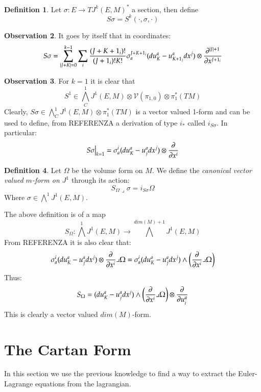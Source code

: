 \documentclass[12pt,a4paper]{report}
\theoremstyle{definition}
\newtheorem{Def}{Definition}[chapter]
\theoremstyle{Theorem}
\theoremstyle{break}
\theoremstyle{definition}
\newtheorem{Obs}[Def]{Observation}
\begin{document}
		\begin{Def}
			Let $\sigma:E\rightarrow TJ^k(E,M)^*$ a section, then define 
			$$S\sigma=S^k(\cdot,\sigma,\cdot)$$
		\end{Def}
		\begin{Obs}
			It goes by itself that in coordinates:
			$$S\sigma=\sum_{|J+K|=0}^{k-1}\sum_i{(J+K+1_i)!\over (J+1_i)!K!}\sigma^{J+K+1_i}_a(du^a_K-u^a_{K+1_j}dx^j)\otimes{\partial^{|J|+1} \over \partial x^{J+1_i}}$$
		\end{Obs}
		\begin{Obs}
			For $k=1$ it is clear that 
			$$S^1\in \bigwedge_C^1J^1(E,M)\otimes \mathcal{V}(\pi_{1,0})\otimes \pi^*_1(TM)$$
			Clearly, $S\sigma\in \bigwedge_C^1J^1(E,M)\otimes \pi^*_1(TM)$ is a vector valued 1-form and can be used to define, from REFERENZA a derivation of type $i_*$ called $i_{S\sigma}$. In particular:
			$$S\sigma\big|_{k=1}=\sigma^{i}_a(du^a_K-u^a_{j}dx^j)\otimes{\partial \over \partial x^{i}}$$
		\end{Obs}
		\begin{Def}
			Let $\Omega$ be the volume form on $M$. We define the \textit{canonical vector valued $m$-form on $J^1$} through its action:
			$$S_\Omega\lrcorner \sigma=i_{S\sigma}\Omega$$
			Where $\sigma\in\bigwedge^1J^1(E,M)$.
		\end{Def}
		The above definition is of a map 
		$$S_\Omega: \bigwedge^{1}J^1(E,M)\rightarrow \bigwedge^{dim(M)+1}J^1(E,M)$$
		From REFERENZA it is also clear that:
		$$\sigma^{i}_a(du^a_K-u^a_{j}dx^j)\otimes{\partial \over \partial x^{i}} \lrcorner \Omega=\sigma^{i}_a(du^a_K-u^a_{j}dx^j)\wedge\bigg({\partial \over \partial x^{i}}\lrcorner \Omega\bigg)$$
		Thus:
		$$S_\Omega=(du^a_K-u^a_{j}dx^j)\wedge\bigg({\partial \over \partial x^{i}}\lrcorner \Omega\bigg)\otimes {\partial\over \partial u^a_i}$$
		This is clearly a vector valued $dim(M)$-form.
		\section{The Cartan Form}
		In this section we use the previous knowledge to find a way to extract the Euler-Lagrange equations from the lagrangian.
	
\end{document}
